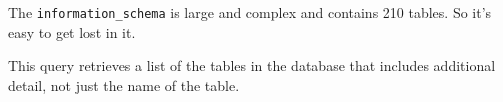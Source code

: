 \documentclass[]{book}
\newenvironment{Shaded}{\begin{snugshade}}{\end{snugshade}}
\newcommand{\KeywordTok}[1]{\textcolor[rgb]{0.13,0.29,0.53}{\textbf{#1}}}
\newcommand{\NormalTok}[1]{#1}
\newcommand{\OperatorTok}[1]{\textcolor[rgb]{0.81,0.36,0.00}{\textbf{#1}}}
\newcommand{\StringTok}[1]{\textcolor[rgb]{0.31,0.60,0.02}{#1}}
\theoremstyle{definition}
\theoremstyle{definition}
\theoremstyle{definition}
\theoremstyle{remark}
\begin{document}
The \texttt{information\_schema} is large and complex and contains 210
tables. So it's easy to get lost in it.

This query retrieves a list of the tables in the database that includes
additional detail, not just the name of the table.

\begin{Shaded}
\end{Shaded}
\end{document}
